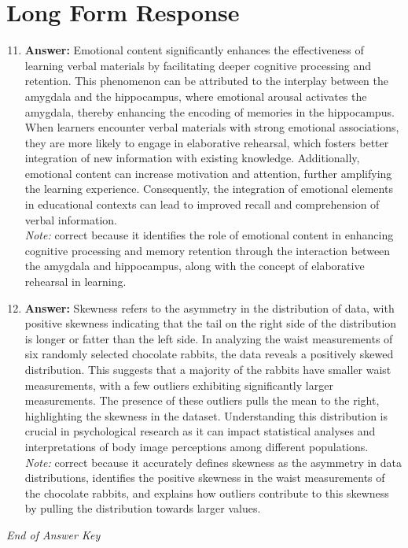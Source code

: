 \documentclass[12pt]{article}
\begin{document}
\section*{Long Form Response}
\begin{enumerate}[label=\arabic*.]
\setcounter{enumi}{10}
\item \textbf{Answer:} Emotional content significantly enhances the effectiveness of learning verbal materials by facilitating deeper cognitive processing and retention. This phenomenon can be attributed to the interplay between the amygdala and the hippocampus, where emotional arousal activates the amygdala, thereby enhancing the encoding of memories in the hippocampus. When learners encounter verbal materials with strong emotional associations, they are more likely to engage in elaborative rehearsal, which fosters better integration of new information with existing knowledge. Additionally, emotional content can increase motivation and attention, further amplifying the learning experience. Consequently, the integration of emotional elements in educational contexts can lead to improved recall and comprehension of verbal information.
\\ \textit{Note:} correct because it identifies the role of emotional content in enhancing cognitive processing and memory retention through the interaction between the amygdala and hippocampus, along with the concept of elaborative rehearsal in learning.
\item \textbf{Answer:} Skewness refers to the asymmetry in the distribution of data, with positive skewness indicating that the tail on the right side of the distribution is longer or fatter than the left side. In analyzing the waist measurements of six randomly selected chocolate rabbits, the data reveals a positively skewed distribution. This suggests that a majority of the rabbits have smaller waist measurements, with a few outliers exhibiting significantly larger measurements. The presence of these outliers pulls the mean to the right, highlighting the skewness in the dataset. Understanding this distribution is crucial in psychological research as it can impact statistical analyses and interpretations of body image perceptions among different populations.
\\ \textit{Note:} correct because it accurately defines skewness as the asymmetry in data distributions, identifies the positive skewness in the waist measurements of the chocolate rabbits, and explains how outliers contribute to this skewness by pulling the distribution towards larger values.
\end{enumerate}

\vfill
\noindent\textit{End of Answer Key}
\end{document}
